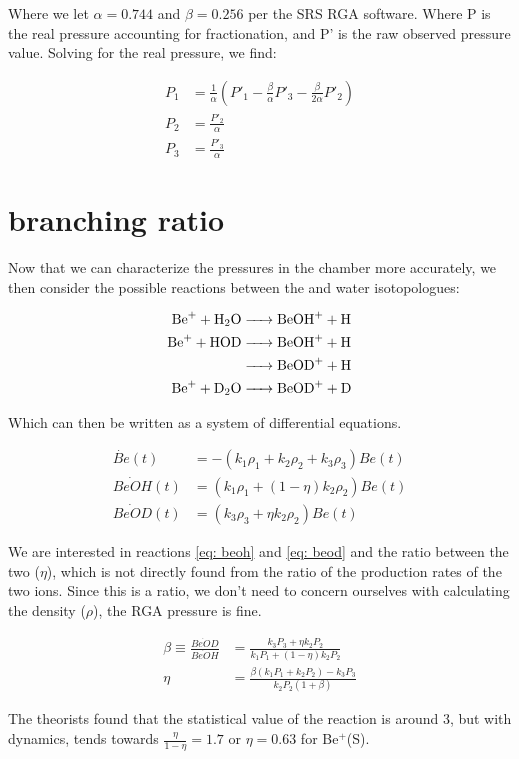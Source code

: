 Where we let $\alpha = 0.744$ and $\beta=0.256$ per the SRS RGA software. Where P is the real pressure accounting for fractionation, and P' is the raw observed pressure value. Solving for the real pressure, we find:

\begin{align}
	P_1 & = \frac{1}{\alpha}\left(P'_1 - \frac{\beta}{\alpha}P'_3 - \frac{\beta}{2\alpha} P'_2\right) \\
	P_2 & = \frac{P'_2}{\alpha} \\
	P_3 & = \frac{P'_3}{\alpha}
\end{align}

\section{ branching ratio}

Now that we can characterize the pressures in the chamber more accurately, we then consider the possible reactions between the  and water isotopologues:

\begin{align}
	\ce{Be+ + H2O & -> BeOH+ + H} \\
	\ce{Be+ + HOD & -> BeOH+ + H} \label{eq: beoh} \\
	\ce{& -> BeOD+ + H} \label{eq: beod} \\
	\ce{Be^+ + D2O & -> BeOD+ + D}
\end{align}

Which can then be written as a system of differential equations.

\begin{align}
	\dot{Be}(t) & = -(k_1\rho_1+k_2\rho_2+k_3\rho_3)Be(t) \\
	\dot{BeOH}(t) & = (k_1\rho_1+(1-\eta)k_2\rho_2)Be(t) \\
	\dot{BeOD}(t) & = (k_3\rho_3+\eta k_2\rho_2)Be(t)
\end{align}

We are interested in reactions \ref{eq: beoh} and \ref{eq: beod} and the ratio between the two ($\eta$), which is not directly found from the ratio of the production rates of the two ions. Since this is a ratio, we don't need to concern ourselves with calculating the density ($\rho$), the RGA pressure is fine.

\begin{align}
	\beta \equiv \frac{\dot{BeOD}}{\dot{BeOH}} & = \frac{k_3P_3 + \eta k_2P_2}{k_1P_1 + (1-\eta)k_2P_2} \\
	\eta & = \frac{\beta(k_1P_1 + k_2P_2)-k_3P_3}{k_2P_2(1+\beta)}
\end{align}

The theorists found that the statistical value of the reaction is around 3, but with dynamics, tends towards $\frac{\eta}{1-\eta} = 1.7$ or $\eta=0.63$ for Be$^+$(S).
